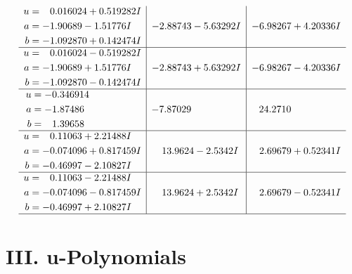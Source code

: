 \documentclass[1p]{elsarticle_modified}
\theoremstyle{definition}
\begin{document}
$$\begin{array}{c|c|c}
\begin{aligned}
u &= \phantom{-}0.016024 + 0.519282 I \\
a &= -1.90689 - 1.51776 I \\
b &= -1.092870 + 0.142474 I\end{aligned}
 & -2.88743 - 5.63292 I & -6.98267 + 4.20336 I \\ \hline\begin{aligned}
u &= \phantom{-}0.016024 - 0.519282 I \\
a &= -1.90689 + 1.51776 I \\
b &= -1.092870 - 0.142474 I\end{aligned}
 & -2.88743 + 5.63292 I & -6.98267 - 4.20336 I \\ \hline\begin{aligned}
u &= -0.346914\phantom{ +0.000000I} \\
a &= -1.87486\phantom{ +0.000000I} \\
b &= \phantom{-}1.39658\phantom{ +0.000000I}\end{aligned}
 & -7.87029\phantom{ +0.000000I} & \phantom{-}24.2710\phantom{ +0.000000I} \\ \hline\begin{aligned}
u &= \phantom{-}0.11063 + 2.21488 I \\
a &= -0.074096 + 0.817459 I \\
b &= -0.46997 - 2.10827 I\end{aligned}
 & \phantom{-}13.9624 - 2.5342 I & \phantom{-}2.69679 + 0.52341 I \\ \hline\begin{aligned}
u &= \phantom{-}0.11063 - 2.21488 I \\
a &= -0.074096 - 0.817459 I \\
b &= -0.46997 + 2.10827 I\end{aligned}
 & \phantom{-}13.9624 + 2.5342 I & \phantom{-}2.69679 - 0.52341 I\\
 \hline 
 \end{array}$$\newpage
\newpage\renewcommand{\arraystretch}{1}
\centering \section*{ III. u-Polynomials}
\end{document}
